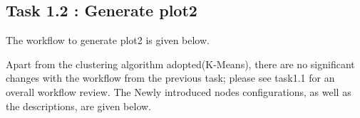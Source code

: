 \documentclass[11pt]{article}
\begin{document}
		\subsection*{Task 1.2 : Generate plot2}
			The workflow to generate plot2 is given below.

			Apart from the clustering algorithm adopted(K-Means), there are no significant changes with the workflow from the previous task; please see task1.1 for an overall workflow review. The Newly introduced nodes configurations, as well as the descriptions, are given below.
			
\end{document}
